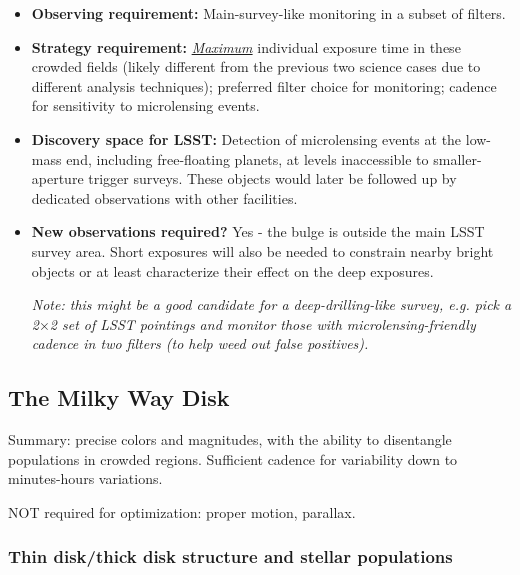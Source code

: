 \begin{itemize}
\item {\bf Observing requirement:} Main-survey-like monitoring in a subset of filters.
\vspace{-2mm}

\item {\bf Strategy requirement:} \underline{\it Maximum} individual exposure time in these crowded fields (likely different from the previous two science cases due to different analysis techniques); preferred filter choice for monitoring; cadence for sensitivity to microlensing events.
\vspace{-2mm}

\item {\bf Discovery space for LSST:} Detection of microlensing events at the low-mass end, including free-floating planets, at levels inaccessible to smaller-aperture trigger surveys. These objects would later be followed up by dedicated observations with other facilities.
\vspace{-2mm}

\item {\bf New observations required?} Yes - the bulge is outside the main LSST survey area. Short exposures will also be needed to constrain nearby bright objects or at least characterize their effect on the deep exposures.

{\it Note: this might be a good candidate for a deep-drilling-like survey, e.g. pick a 2$\times$2 set of LSST pointings and monitor those with microlensing-friendly cadence in two filters (to help weed out false positives).}

\vspace{-2mm}
\end{itemize}

\subsection{The Milky Way Disk}

Summary: precise colors and magnitudes, with the ability to
disentangle populations in crowded regions. Sufficient cadence for
variability down to minutes-hours variations.

NOT required for optimization: proper motion, parallax.

\subsubsection{Thin disk/thick disk structure and stellar populations}


